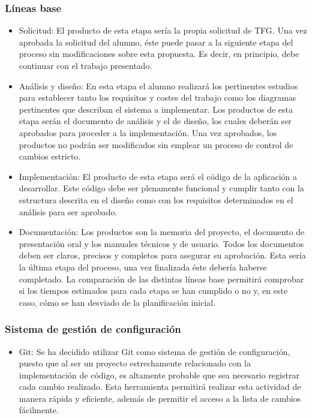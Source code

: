 \documentclass[10pt,a4paper]{article}
\begin{document}
			\subsubsection{Líneas base}
				\begin{itemize}
			    	\item Solicitud: El producto de esta etapa sería la propia solicitud de TFG. Una vez aprobada la solicitud del alumno, éste puede pasar a la siguiente etapa del proceso sin modificaciones sobre esta propuesta. Es decir, en principio, debe continuar con el trabajo presentado.
			    	\item Análisis y diseño: En esta etapa el alumno realizará los pertinentes estudios para establecer tanto los requisitos y costes del trabajo como los diagramas pertinentes que describan el sistema a implementar. Los productos de esta etapa serán el documento de análisis y el de diseño, los cuales deberán ser aprobados para proceder a la implementación. Una vez aprobados, los productos no podrán ser modificados sin emplear un proceso de control de cambios estricto.
			   	 	\item Implementación: El producto de esta etapa será el código de la aplicación a desarrollar. Este código debe ser plenamente funcional y cumplir tanto con la estructura descrita en el diseño como con los requisitos determinados en el análisis para ser aprobado.
			   		\item Documentación: Los productos son la memoria del proyecto, el documento de presentación oral y los manuales técnicos y de usuario. Todos los documentos deben ser claros, precisos y completos para asegurar su aprobación. Esta sería la última etapa del proceso, una vez finalizada éste debería haberse completado. La comparación de las distintas líneas base permitirá comprobar si los tiempos estimados para cada etapa se han cumplido o no y, en este caso, cómo se han desviado de la planificación inicial.	    			    
				\end{itemize}
			\subsubsection{Sistema de gestión de configuración}
			\begin{itemize}
			    \item Git: Se ha decidido utilizar Git como sistema de gestión de configuración, puesto que al ser un proyecto estrechamente relacionado con la implementación de código, es altamente probable que sea necesario registrar cada cambio realizado. Esta herramienta permitirá realizar esta actividad de manera rápida y eficiente, además de permitir el acceso a la lista de cambios fácilmente.
			\end{itemize}
\end{document}
